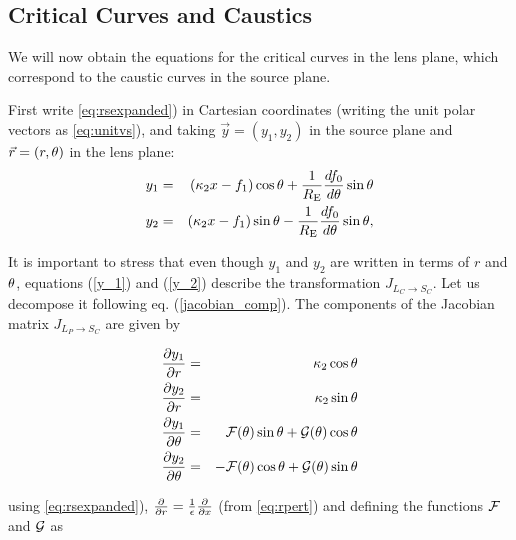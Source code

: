 \subsection{Critical Curves and Caustics}

We will now obtain the equations for the critical curves in the lens
plane, which correspond to the caustic curves in the source plane.

First write \eqref{eq:rsexpanded}) in Cartesian coordinates (writing
the unit polar vectors as \eqref{eq:unitvs}), and taking
$\vec{y}=(y_1,y_2)$ in the source plane and $\vec{r}=(r,\theta)$ in the
lens plane:
\begin{eqnarray}
y_{1} &=& (\kappa_2 x - f_1)\cos{\theta}+\frac{1}{R_{\mathrm{E}}}\frac{d f_0}{d\theta}\sin{\theta}
\label{y_1}\\
y_{2} &=& (\kappa_2 x - f_1)\sin{\theta}-\frac{1}{R_{\mathrm{E}}}\frac{d f_0}{d\theta}\sin{\theta}
\label{y_2},
\end{eqnarray}

It is important to stress that even though $y_{1}$ and $y_{2}$ are written in
terms of $r$ and $\theta$, equations (\ref{y_1}) and (\ref{y_2}) describe the
transformation $J_{L_C\rightarrow S_C}$. Let us decompose it following eq.
(\ref{jacobian_comp}). The components of the Jacobian matrix $J_{L_P\rightarrow
S_C}$ are given by %


\begin{eqnarray}
\frac{\partial y_1}{\partial r}&=& \kappa_2 \cos{\theta}\label{dy1dx}   \\
\frac{\partial y_2}{\partial r}&=& \kappa_2 \sin{\theta}\\
\frac{\partial y_1}{\partial \theta}&=& \mathcal{F}(\theta)\sin{\theta}+\mathcal{G}(\theta)\cos{\theta}\\
\frac{\partial y_2}{\partial \theta}&=&
-\mathcal{F}(\theta)\cos{\theta}+\mathcal{G}(\theta)\sin{\theta}\label{dy2dte}
\end{eqnarray}

using \eqref{eq:rsexpanded}), ${\partial \over \partial r} ={ 1 \over \epsilon}
{\partial \over \partial x}$ (from \eqref{eq:rpert}) and defining the functions
$\mathcal{F}$ and $\mathcal{G}$ as

